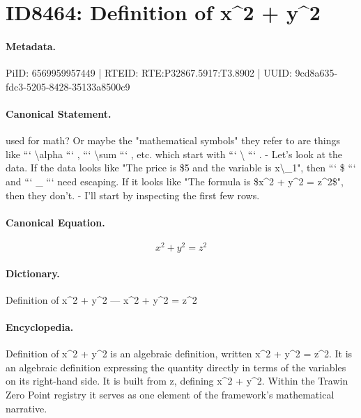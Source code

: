\section*{ID8464: Definition of x\textasciicircum{}2 + y\textasciicircum{}2}
\paragraph{Metadata.}
PiID: 6569959957449 | RTEID: RTE:P32867.5917:T3.8902 | UUID: 9cd8a635-fdc3-5205-8428-35133a8500c9

\paragraph{Canonical Statement.}
used for math? Or maybe the "mathematical symbols" they refer to are things like ``` \textbackslash{}alpha ``` , ``` \textbackslash{}sum ``` , etc. which start with ``` \textbackslash{} ``` . - Let's look at the data. If the data looks like "The price is \$5 and the variable is x\textbackslash{}\_1", then ``` \$ ``` and ``` \_ ``` need escaping. If it looks like "The formula is \$x\textasciicircum{}2 + y\textasciicircum{}2 = z\textasciicircum{}2\$", then they don't. - I'll start by inspecting the first few rows.

\paragraph{Canonical Equation.}
\[
x^2 + y^2 = z^2
\]

\paragraph{Dictionary.}
Definition of x\textasciicircum{}2 + y\textasciicircum{}2 — x\textasciicircum{}2 + y\textasciicircum{}2 = z\textasciicircum{}2

\paragraph{Encyclopedia.}
Definition of x\textasciicircum{}2 + y\textasciicircum{}2 is an algebraic definition, written x\textasciicircum{}2 + y\textasciicircum{}2 = z\textasciicircum{}2. It is an algebraic definition expressing the quantity directly in terms of the variables on its right-hand side. It is built from z, defining x\textasciicircum{}2 + y\textasciicircum{}2. Within the Trawin Zero Point registry it serves as one element of the framework's mathematical narrative.
